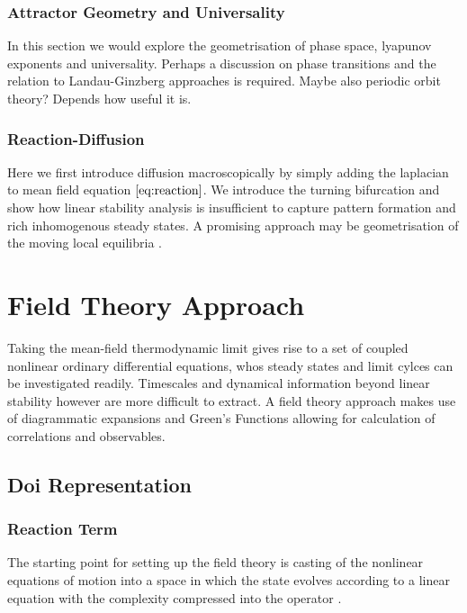 \documentclass{article}[12pt]
\numberwithin{equation}{section}
\begin{document}
\subsubsection{Attractor Geometry and Universality}
In this section we would explore the geometrisation of phase space, lyapunov
exponents and universality. Perhaps a discussion on phase transitions and
the relation to Landau-Ginzberg approaches is required.
Maybe also periodic orbit theory? Depends how useful it is.
\subsubsection{Reaction-Diffusion}
Here we first introduce diffusion macroscopically by simply adding the laplacian
to mean field equation $\eqref{eq:reaction}$. We introduce the turning bifurcation and
show how linear stability analysis is insufficient to capture pattern formation
and rich inhomogenous steady states. A promising approach may be geometrisation
of the moving local equilibria \cite{Halatek2018}.

\pagebreak
\section{Field Theory Approach}\vspace{-10pt}
Taking the mean-field thermodynamic limit gives rise to a set of coupled nonlinear
ordinary differential equations, whos steady states and limit cylces can be investigated
readily. Timescales and dynamical information beyond linear stability however are more
difficult to extract. A field theory approach makes use of diagrammatic expansions
and Green's Functions allowing for calculation of correlations and observables.
\vspace{-15pt}
\subsection{Doi Representation}
\vspace{-10pt}
\subsubsection{Reaction Term}
\vspace{-10pt}
The starting point for setting up the field theory is casting of the nonlinear
equations of motion into a space in which the state evolves according to a linear
equation with the complexity compressed into the operator \cite{Doi1976}.
\end{document}

